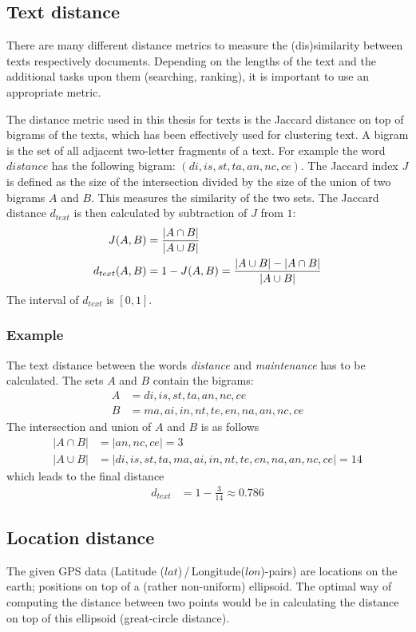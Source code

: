 \subsection{Text distance}
There are many different distance metrics to measure the (dis)similarity between texts respectively documents\cite{Huang2008}. Depending on the lengths of the text and the additional tasks upon them (searching, ranking), it is important to use an appropriate metric.

The distance metric used in this thesis for texts is the Jaccard distance\cite{Manning2009} on top of bigrams of the texts, which has been effectively used for clustering text\cite{Huang2008}. A bigram is the set of all adjacent two-letter fragments of a text. For example the word $distance$ has the following bigram: $(di, is, st, ta, an, nc, ce)$. The Jaccard index $J$ is defined as the size of the intersection divided by the size of the union of two bigrams $A$ and $B$. This measures the similarity of the two sets. The Jaccard distance $d_{text}$ is then calculated by subtraction of $J$ from $1$:
%
\enlargethispage{\baselineskip}
\begin{align}
J(A, B) &= \frac{|A \cap B|}{|A \cup B|}\notag\\
d_{text}(A, B) &= 1 - J(A, B) = \frac{|A \cup B| - |A \cap B|}{|A \cup B|}
\end{align}
The interval of $d_{text}$ is $[0, 1]$.

\subsubsection{Example}
The text distance between the words \emph{distance} and \emph{maintenance} has to be calculated. The sets $A$ and $B$ contain the bigrams:
\begin{align*}
A &= di, is, st, ta, an, nc, ce\\
B &= ma, ai, in, nt, te, en, na, an, nc, ce
\end{align*}
%
The intersection and union of $A$ and $B$ is as follows
\begin{align*}
|A \cap B| &= |an, nc, ce| = 3\\ %
|A \cup B| &= |di, is, st, ta, ma, ai, in, nt, te, en, na, an, nc, ce| = 14 %
\end{align*}
%
which leads to the final distance
\begin{align*}
d_{text} &= 1 - \frac{3}{14} \approx 0.786
\end{align*}

\subsection{Location distance}
The given GPS data (Latitude ($lat$)\,/\,Longitude($lon$)-pairs) are locations on the earth; positions on top of a (rather non-uniform) ellipsoid. The optimal way of computing the distance between two points would be in calculating the distance on top of this ellipsoid (great-circle distance).

